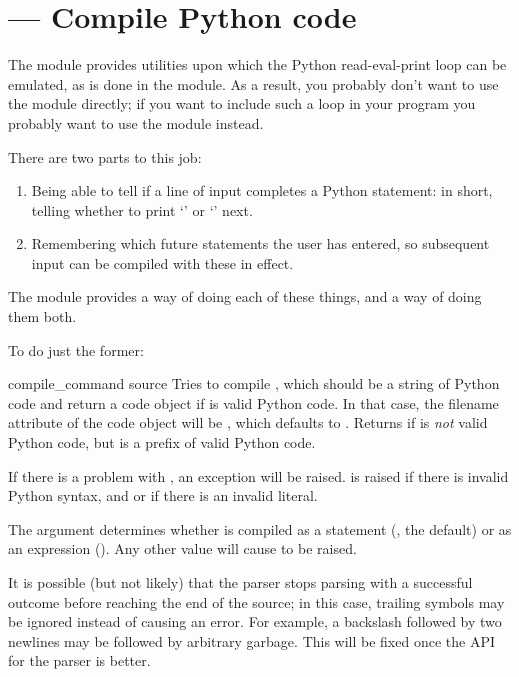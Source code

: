 \section{ ---
         Compile Python code}



The  module provides utilities upon which the Python
read-eval-print loop can be emulated, as is done in the
 module.  As a result, you probably don't want to use
the module directly; if you want to include such a loop in your
program you probably want to use the  module instead.

There are two parts to this job: 

\begin{enumerate}
  \item Being able to tell if a line of input completes a Python 
        statement: in short, telling whether to print
        `\code{>\code{>}>~}' or `' next.
  \item Remembering which future statements the user has entered, so 
        subsequent input can be compiled with these in effect.
\end{enumerate}

The  module provides a way of doing each of these
things, and a way of doing them both.

To do just the former:

\begin{funcdesc}{compile_command}
                {source}
Tries to compile , which should be a string of Python
code and return a code object if  is valid
Python code. In that case, the filename attribute of the code object
will be , which defaults to .
Returns  if  is \emph{not} valid Python
code, but is a prefix of valid Python code.

If there is a problem with , an exception will be raised.
 is raised if there is invalid Python syntax,
and  or  if there is an
invalid literal.

The  argument determines whether  is compiled
as a statement (, the default) or as an expression
().  Any other value will cause  to 
be raised.

It is possible (but not likely) that the parser stops parsing
with a successful outcome before reaching the end of the source;
in this case, trailing symbols may be ignored instead of causing an
error.  For example, a backslash followed by two newlines may be
followed by arbitrary garbage.  This will be fixed once the API
for the parser is better.
\end{funcdesc}

